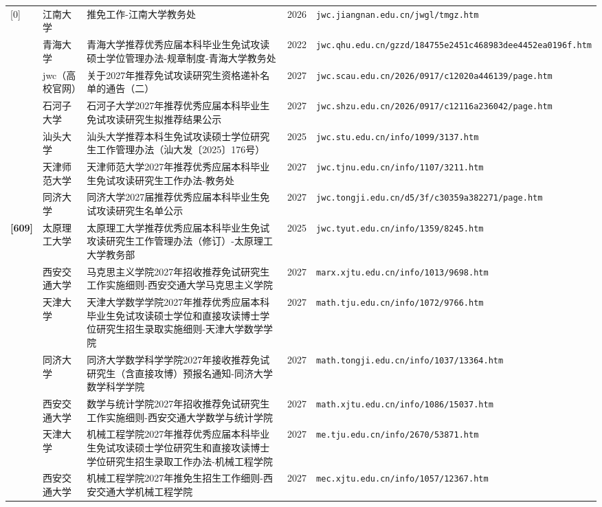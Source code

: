 {\begin{longtable}{@{}p{1.15cm}p{2.9cm}p{6.3cm}p{0.85cm}p{5.0cm}@{}}
[0] & 江南大学 & 推免工作-江南大学教务处 & 2026 & \texttt{jwc.jiangnan.edu.cn/jwgl/tmgz.htm} \\
[0] & 青海大学 & 青海大学推荐优秀应届本科毕业生免试攻读硕士学位管理办法-规章制度-青海大学教务处 & 2022 & \texttt{jwc.qhu.edu.cn/gzzd/184755e2451c468983dee4452ea0196f.htm} \\
[0] & jwc（高校官网） & 关于2027年推荐免试攻读研究生资格递补名单的通告（二） & 2027 & \texttt{jwc.scau.edu.cn/2026/0917/c12020a446139/page.htm} \\
[0] & 石河子大学 & 石河子大学2027年推荐优秀应届本科毕业生免试攻读研究生拟推荐结果公示 & 2027 & \texttt{jwc.shzu.edu.cn/2026/0917/c12116a236042/page.htm} \\
[0] & 汕头大学 & 汕头大学推荐本科生免试攻读硕士学位研究生工作管理办法（汕大发〔2025〕176号） & 2025 & \texttt{jwc.stu.edu.cn/info/1099/3137.htm} \\
[0] & 天津师范大学 & 天津师范大学2027年推荐优秀应届本科毕业生免试攻读研究生工作办法-教务处 & 2027 & \texttt{jwc.tjnu.edu.cn/info/1107/3211.htm} \\
[0] & 同济大学 & 同济大学2027届推荐优秀应届本科毕业生免试攻读研究生名单公示 & 2027 & \texttt{jwc.tongji.edu.cn/d5/3f/c30359a382271/page.htm} \\
\textbf{[609]} & 太原理工大学 & 太原理工大学推荐优秀应届本科毕业生免试攻读研究生工作管理办法（修订）-太原理工大学教务部 & 2025 & \texttt{jwc.tyut.edu.cn/info/1359/8245.htm} \\
[0] & 西安交通大学 & 马克思主义学院2027年招收推荐免试研究生工作实施细则-西安交通大学马克思主义学院 & 2027 & \texttt{marx.xjtu.edu.cn/info/1013/9698.htm} \\
[0] & 天津大学 & 天津大学数学学院2027年推荐优秀应届本科毕业生免试攻读硕士学位和直接攻读博士学位研究生招生录取实施细则-天津大学数学学院 & 2027 & \texttt{math.tju.edu.cn/info/1072/9766.htm} \\
[0] & 同济大学 & 同济大学数学科学学院2027年接收推荐免试研究生（含直接攻博）预报名通知-同济大学数学科学学院 & 2027 & \texttt{math.tongji.edu.cn/info/1037/13364.htm} \\
[0] & 西安交通大学 & 数学与统计学院2027年招收推荐免试研究生工作实施细则-西安交通大学数学与统计学院 & 2027 & \texttt{math.xjtu.edu.cn/info/1086/15037.htm} \\
[0] & 天津大学 & 机械工程学院2027年推荐优秀应届本科毕业生免试攻读硕士学位研究生和直接攻读博士学位研究生招生录取工作办法-机械工程学院 & 2027 & \texttt{me.tju.edu.cn/info/2670/53871.htm} \\
[0] & 西安交通大学 & 机械工程学院2027年推免生招生工作细则-西安交通大学机械工程学院 & 2027 & \texttt{mec.xjtu.edu.cn/info/1057/12367.htm} \\

\end{longtable}}
